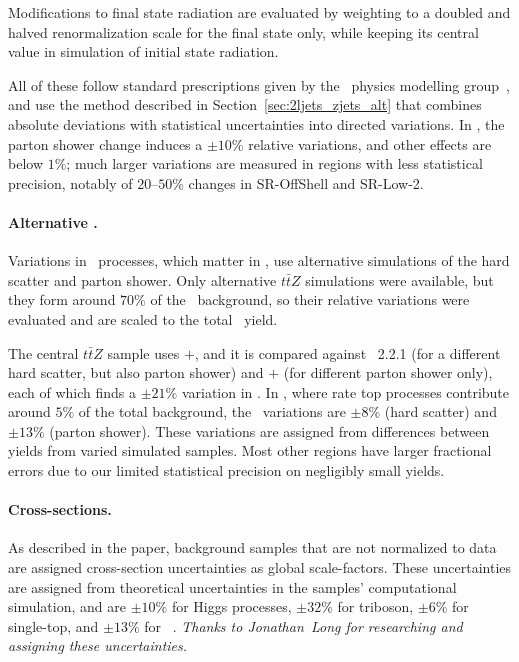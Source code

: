 Modifications to final state radiation are evaluated by weighting to a doubled
and halved renormalization scale for the final state only, while keeping
its central value in simulation of initial state radiation.

All of these follow standard prescriptions given by the \atlas\ physics
modelling group~\cite{atlas_twiki_top}, and use the method described in
Section~\ref{sec:2ljets_zjets_alt} that combines absolute deviations with
statistical uncertainties into directed variations.
In \crtt, the parton shower change induces a $\pm10\%$ relative variations,
and other effects are below $1\%$; much larger variations are measured in
regions with less statistical precision, notably of $20\textrm{--}50\%$ changes
in SR-OffShell and SR-Low-2.

\paragraph{Alternative \topother.}
Variations in \topother\ processes, which matter in \srllbb, use
alternative simulations of the hard scatter and parton shower.
Only alternative $t\bar{t}Z$ simulations were available, but they form around
$70\%$ of the \topother\ background, so their relative variations were evaluated
and are scaled to the total \topother\ yield.

The central $t\bar{t}Z$ sample uses \amcatnlo$+$, and it is compared
against \pythia~2.2.1 (for a different hard scatter, but also parton shower)
and \amcatnlo$+$ (for different parton shower only), each of which
finds a $\pm21\%$ variation in \srllbb.
In \crtt,
where rate top processes contribute around $5\%$ of the total background,
the \topother\ variations are
$\pm8\%$ (hard scatter) and
$\pm13\%$ (parton shower).
These variations are assigned from differences between yields from varied
simulated samples.
Most other regions have larger fractional errors due to our limited
statistical precision on negligibly small yields.

\paragraph{Cross-sections.}
As described in the paper,
background samples that are not normalized to data are assigned cross-section
uncertainties as global scale-factors.
These uncertainties are assigned from theoretical uncertainties in
the samples' computational simulation, and are $\pm10\%$ for Higgs processes,
$\pm32\%$ for triboson,
$\pm6\%$ for single-top,
and $\pm13\%$ for \topother~\cite{atlas2022searches}.
\emph{Thanks to Jonathan~Long for researching and assigning these uncertainties.}

